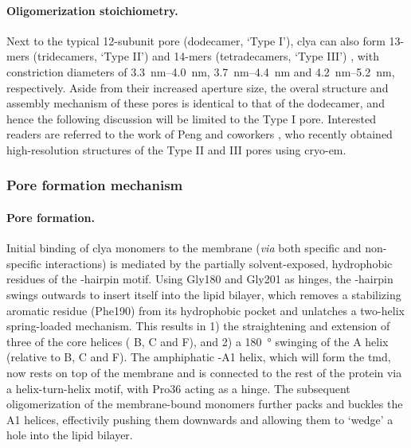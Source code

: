 \paragraph{Oligomerization stoichiometry.}
%
Next to the typical 12-subunit pore (dodecamer, `Type I'), \gls{clya} can also form 13-mers (tridecamers,
`Type II') and 14-mers (tetradecamers, `Type III') \cite{Soskine-2013,Peng-2019}, with constriction diameters
of \SIrange{3.3}{4.0}{\nm}, \SIrange{3.7}{4.4}{\nm} and \SIrange{4.2}{5.2}{\nm}, respectively. Aside from
their increased aperture size, the overal structure and assembly mechanism of these pores is identical to that
of the dodecamer, and hence the following discussion will be limited to the Type I pore. Interested readers
are referred to the work of Peng and coworkers \cite{Peng-2019}, who recently obtained high-resolution
structures of the Type II and III pores using \gls{cryo-em}.

\subsubsection{Pore formation mechanism}

\paragraph{Pore formation.}
%
Initial binding of \gls{clya} monomers to the membrane (\textit{via} both specific and non-specific
interactions) is mediated by the partially solvent-exposed, hydrophobic residues of the \tb-hairpin motif.
Using Gly180 and Gly201 as hinges, the \tb-hairpin swings outwards to insert itself into the lipid bilayer,
which removes a stabilizing aromatic residue (Phe190) from its hydrophobic pocket and unlatches a two-helix
spring-loaded mechanism. This results in 1) the straightening and extension of three of the core helices (\ta
B, \ta C and \ta F), and 2) a \SI{180}{\degree} swinging of the \ta A helix (relative to \ta B, \ta C and \ta
F). The amphiphatic \ta-A1 helix, which will form the \gls{tmd}, now rests on top of the membrane and is
connected to the rest of the protein via a helix-turn-helix motif, with Pro36 acting as a hinge. The
subsequent oligomerization of the membrane-bound monomers further packs and buckles the \ta A1 helices,
effectivily pushing them downwards and allowing them to `wedge' a hole into the lipid bilayer.

